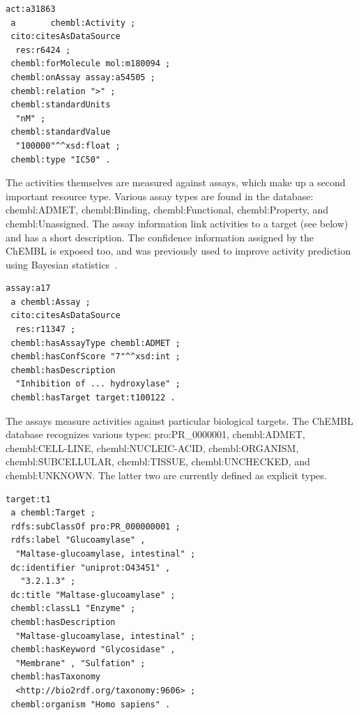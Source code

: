 \documentclass[sw]{iosart2c}
\begin{document}
\begin{footnotesize}
\begin{verbatim}
act:a31863
 a       chembl:Activity ;
 cito:citesAsDataSource
  res:r6424 ;
 chembl:forMolecule mol:m180094 ;
 chembl:onAssay assay:a54505 ;
 chembl:relation ">" ;
 chembl:standardUnits
  "nM" ;
 chembl:standardValue
  "100000"^^xsd:float ;
 chembl:type "IC50" .
\end{verbatim}
\end{footnotesize}

The activities themselves are measured against assays, which make up a second important
resource type. Various assay types are found in the database: chembl:ADMET, chembl:Binding,
chembl:Functional, chembl:Property, and chembl:Unassigned. The assay information link
activities to a target (see below) and has a short description. The confidence information
assigned by the ChEMBL is exposed too, and was previously used to improve activity
prediction using Bayesian statistics~\cite{Willighagen2011}.

\begin{footnotesize}
\begin{verbatim}
assay:a17
 a chembl:Assay ;
 cito:citesAsDataSource
  res:r11347 ;
 chembl:hasAssayType chembl:ADMET ;
 chembl:hasConfScore "7"^^xsd:int ;
 chembl:hasDescription
  "Inhibition of ... hydroxylase" ;
 chembl:hasTarget target:t100122 .
\end{verbatim}
\end{footnotesize}

The assays measure activities against particular biological targets. The ChEMBL database
recognizes various types: pro:PR\_0000001, chembl:ADMET, chembl:CELL-LINE,
chembl:NUCLEIC-ACID, chembl:ORGANISM, chembl:SUBCELLULAR, chembl:TISSUE,
chembl:UNCHECKED, and chembl:UNKNOWN. The latter two are currently defined as
explicit types.

\begin{footnotesize}
\begin{verbatim}
target:t1
 a chembl:Target ;
 rdfs:subClassOf pro:PR_000000001 ;
 rdfs:label "Glucoamylase" , 
  "Maltase-glucoamylase, intestinal" ;
 dc:identifier "uniprot:O43451" ,
   "3.2.1.3" ;
 dc:title "Maltase-glucoamylase" ;
 chembl:classL1 "Enzyme" ;
 chembl:hasDescription
  "Maltase-glucoamylase, intestinal" ;
 chembl:hasKeyword "Glycosidase" , 
  "Membrane" , "Sulfation" ;
 chembl:hasTaxonomy
  <http://bio2rdf.org/taxonomy:9606> ;
 chembl:organism "Homo sapiens" .
\end{verbatim}
\end{footnotesize}
\end{document}
